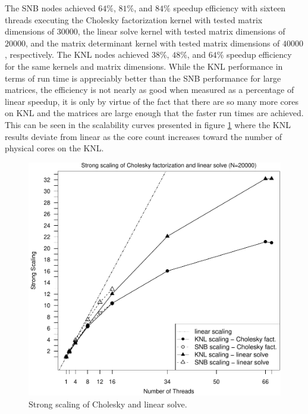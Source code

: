 The SNB nodes achieved $64\%$, $81\%$, and $84\%$ speedup efficiency with sixteen threads
executing the Cholesky factorization kernel with tested matrix dimensions of $30000$, the
linear solve kernel with tested matrix dimensions of $20000$, and the matrix determinant
kernel with tested matrix dimensions of $40000$, respectively.
The KNL nodes achieved $38\%$, $48\%$, and $64\%$ speedup efficiency
for the same kernels and matrix dimensions. While the KNL performance in terms of
run time is appreciably better than the SNB performance for large matrices, the efficiency
is not nearly as good when measured as a percentage of linear speedup, it is only by
virtue of the fact that there are so many more cores on KNL and the matrices are large
enough that the faster run times are achieved.
This can be seen in the scalability curves
presented in figure \ref{fig:cholSolveScale} where the KNL results deviate from linear as
the core count increases toward the number of physical cores on the KNL.
\begin{figure}
\includegraphics[height=\columnwidth, width=\columnwidth]{chol_solve_20000_68-ss.pdf}
\caption{Strong scaling of Cholesky and linear solve.}
\label{fig:cholSolveScale}
\end{figure}

